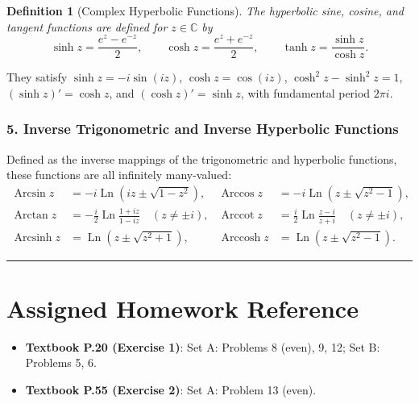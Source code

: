 \documentclass[11pt,a4paper]{article}
\theoremstyle{definitionbreak}
\newtheorem{definition}{Definition}
\theoremstyle{examplebreak}
\theoremstyle{plain}
\begin{document}
\begin{definition}[Complex Hyperbolic Functions]
The hyperbolic sine, cosine, and tangent functions are defined for $z \in \mathbb{C}$ by
\[
    \sinh z = \frac{e^z - e^{-z}}{2}, \qquad \cosh z = \frac{e^z + e^{-z}}{2}, \qquad \tanh z = \frac{\sinh z}{\cosh z}.
\]
\end{definition}

They satisfy $\sinh z = -i\sin(iz)$, $\cosh z = \cos(iz)$, $\cosh^2 z - \sinh^2 z = 1$, $(\sinh z)' = \cosh z$, and $(\cosh z)' = \sinh z$, with fundamental period $2\pi i$.

\subsubsection{5. Inverse Trigonometric and Inverse Hyperbolic Functions}

Defined as the inverse mappings of the trigonometric and hyperbolic functions, these functions are all infinitely many-valued:
\begin{align*}
    \operatorname{Arcsin} z &= -i\operatorname{Ln}\left(iz \pm \sqrt{1 - z^2}\right), & \operatorname{Arccos} z &= -i\operatorname{Ln}\left(z \pm \sqrt{z^2 - 1}\right), \\[6pt]
    \operatorname{Arctan} z &= -\frac{i}{2}\operatorname{Ln}\frac{1 + iz}{1 - iz} \quad (z \neq \pm i), & \operatorname{Arccot} z &= \frac{i}{2}\operatorname{Ln}\frac{z - i}{z + i} \quad (z \neq \pm i), \\[6pt]
    \operatorname{Arcsinh} z &= \operatorname{Ln}\left(z \pm \sqrt{z^2 + 1}\right), & \operatorname{Arccosh} z &= \operatorname{Ln}\left(z \pm \sqrt{z^2 - 1}\right).
\end{align*}

\vspace{0.8em}
\noindent\rule{\textwidth}{0.5pt}
\section*{Assigned Homework Reference}
\begin{itemize}
    \item \textbf{Textbook P.20 (Exercise 1)}: Set A: Problems 8 (even), 9, 12; \quad Set B: Problems 5, 6.
    \item \textbf{Textbook P.55 (Exercise 2)}: Set A: Problem 13 (even).
\end{itemize}
\end{document}
